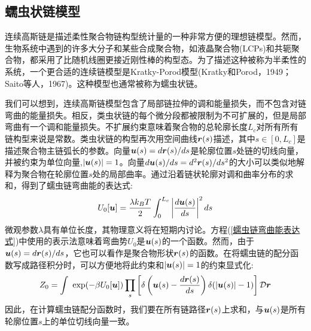 \subsection{蠕虫状链模型}
\begin{center}
\author{王鑫}
\end{center}
\qquad 连续高斯链是描述柔性聚合物链构型统计量的一种非常方便的理想链模型。然而，生物系统中遇到的许多大分子和某些合成聚合物，如液晶聚合物(LCPs)和共轭聚合物，都采用了比随机线圈更接近刚性棒的构型态。为了描述这种被称为半柔性的系统，一个更合适的连续链模型是Kratky-Porod模型(Kratky和Porod，1949；Saito等人，1967)。这种模型也通常被称为蠕虫状链。

我们可以想到，连续高斯链模型包含了局部链拉伸的调和能量损失，而不包含对链弯曲的能量损失。相反，类虫状链的每个微分段都被限制为不可扩展的，但是局部弯曲有一个调和能量损失。不扩展约束意味着聚合物的总轮廓长度$L_c$对所有所有链构型来说是常数。类虫状链的构型再次用空间曲线$\bm{r}(s)$描述，其中$s\in [0,L_c]$是描述聚合物主链弧长的参数。向量$\bm{u}(s)=d\bm{r}(s)/ds$是轮廓位置$s$处链的切线向量，并被约束为单位向量,$|\bm{u}(s)| =1$。向量$d\bm{u}(s)/ds=d^2\bm{r}(s)/ds^2$的大小可以类似地解释为聚合物在轮廓位置$s$处的局部曲率。通过沿着链状轮廓对调和曲率分布的求和，得到了蠕虫链弯曲能的表达式:\\
\begin{equation}
	U_0[\bm{u}]=\frac{\lambda k_B T}{2}\int_{0}^{L_c}\left|\frac{d\bm{u}(s)}{ds}\right|^2 ds \label{蠕虫链弯曲能表达式}
\end{equation}
微观参数$\lambda$具有单位长度，其物理意义将在短期内讨论。方程(\ref{蠕虫链弯曲能表达式})中使用的表示法意味着弯曲势$U_0$是$\bm{u}(s)$的一个函数。然而，由于$\bm{u}(s)=d\bm{r}(s)/ds$，它也可以看作是聚合物形状$\bm{r}(s)$的函数。在将蠕虫链的配分函数写成路径积分时，可以方便地将此约束和$|\bm{u}(s)|=1$的约束显式化:\\
\begin{equation}
	Z_0=\int\ \exp (-\beta U_0[\bm{u}])\prod_s\left[\delta\left(\bm{u}(s)-\frac{d\bm{r}(s)}{ds}\right)\delta(|\bm{u}(s)|-1)\right] \mathcal{D} \bm{r}\label{蠕虫链的配分函数加约束}
\end{equation}
因此，在计算蠕虫链配分函数时，我们要在所有链路径$\bm{r}(s)$上求和，与$\bm{u}(s)$是所有轮廓位置$s$上的单位切线向量一致。\\


